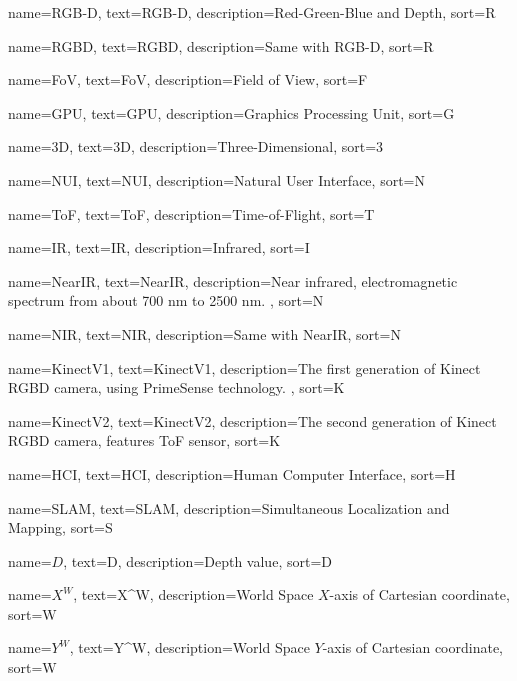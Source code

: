 %
{%
  name={RGB-D},
  text={RGB-D},
  description={Red-Green-Blue and Depth},
  sort={R}
}

%
{%
  name={RGBD},
  text={RGBD},
  description={Same with \gls{RGB-D}},
  sort={R}
}

%
{%
  name={FoV},
  text={FoV},
  description={Field of View},
  sort={F}
}

%
{%
  name={GPU},
  text={GPU},
  description={Graphics Processing Unit},
  sort={G}
}

%
{%
  name={3D},
  text={3D},
  description={Three-Dimensional},
  sort={3}
}

%
{%
  name={NUI},
  text={NUI},
  description={Natural User Interface},
  sort={N}
}

%
{%
  name={ToF},
  text={ToF},
  description={Time-of-Flight},
  sort={T}
}

%
{%
  name={IR},
  text={IR},
  description={Infrared},
  sort={I}
}

%
{%
  name={NearIR},
  text={NearIR},
  description={Near infrared, electromagnetic spectrum from about 700 nm to 2500 nm. },
  sort={N}
}

%
{%
  name={NIR},
  text={NIR},
  description={Same with \gls{NearIR}},
  sort={N}
}

%
{%
  name={KinectV1},
  text={KinectV1},
  description={The first generation of Kinect  \gls{RGBD} camera, using PrimeSense technology. },
  sort={K}
}

%
{%
  name={KinectV2},
  text={KinectV2},
  description={The second generation of Kinect \gls{RGBD} camera, features \gls{ToF} sensor},
  sort={K}
}

%
{%
  name={HCI},
  text={HCI},
  description={Human Computer Interface},
  sort={H}
}

%
{%
  name={SLAM},
  text={SLAM},
  description={Simultaneous Localization and Mapping},
  sort={S}
}

%
{%
  name={$D$},
  text={D},
  description={Depth value},
  sort={D}
}

%
{%
  name={$X^W$},
  text={X^W},
  description={World Space $X$-axis of Cartesian coordinate},
  sort={W}
}

%
{%
  name={$Y^W$},
  text={Y^W},
  description={World Space $Y$-axis of Cartesian coordinate},
  sort={W}
}

